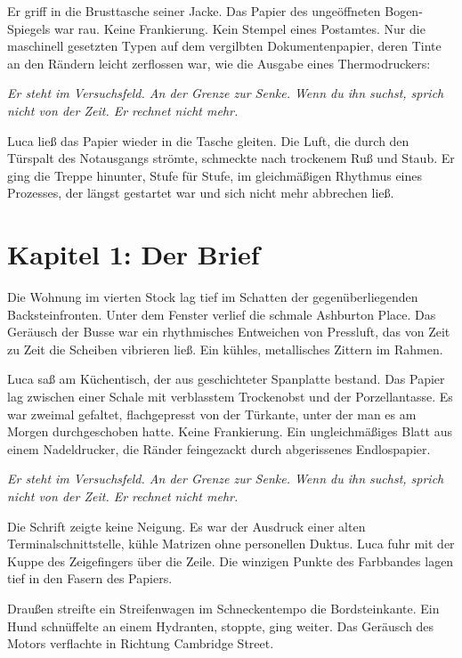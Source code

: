 \documentclass[
  ngerman,
]{article}
\begin{document}
Er griff in die Brusttasche seiner Jacke. Das Papier des ungeöffneten
Bogen-Spiegels war rau. Keine Frankierung. Kein Stempel eines Postamtes.
Nur die maschinell gesetzten Typen auf dem vergilbten Dokumentenpapier,
deren Tinte an den Rändern leicht zerflossen war, wie die Ausgabe eines
Thermodruckers:

\emph{Er steht im Versuchsfeld. An der Grenze zur Senke. Wenn du ihn
suchst, sprich nicht von der Zeit. Er rechnet nicht mehr.}

Luca ließ das Papier wieder in die Tasche gleiten. Die Luft, die durch
den Türspalt des Notausgangs strömte, schmeckte nach trockenem Ruß und
Staub. Er ging die Treppe hinunter, Stufe für Stufe, im gleichmäßigen
Rhythmus eines Prozesses, der längst gestartet war und sich nicht mehr
abbrechen ließ.

\section{\texorpdfstring{\textbf{Kapitel 1: Der
Brief}}{Kapitel 1: Der Brief}}\label{kapitel-1-der-brief}

Die Wohnung im vierten Stock lag tief im Schatten der gegenüberliegenden
Backsteinfronten. Unter dem Fenster verlief die schmale Ashburton Place.
Das Geräusch der Busse war ein rhythmisches Entweichen von Pressluft,
das von Zeit zu Zeit die Scheiben vibrieren ließ. Ein kühles,
metallisches Zittern im Rahmen.

Luca saß am Küchentisch, der aus geschichteter Spanplatte bestand. Das
Papier lag zwischen einer Schale mit verblasstem Trockenobst und der
Porzellantasse. Es war zweimal gefaltet, flachgepresst von der Türkante,
unter der man es am Morgen durchgeschoben hatte. Keine Frankierung. Ein
ungleichmäßiges Blatt aus einem Nadeldrucker, die Ränder feingezackt
durch abgerissenes Endlospapier.

\emph{Er steht im Versuchsfeld. An der Grenze zur Senke. Wenn du ihn
suchst, sprich nicht von der Zeit. Er rechnet nicht mehr.}

Die Schrift zeigte keine Neigung. Es war der Ausdruck einer alten
Terminalschnittstelle, kühle Matrizen ohne personellen Duktus. Luca fuhr
mit der Kuppe des Zeigefingers über die Zeile. Die winzigen Punkte des
Farbbandes lagen tief in den Fasern des Papiers.

Draußen streifte ein Streifenwagen im Schneckentempo die Bordsteinkante.
Ein Hund schnüffelte an einem Hydranten, stoppte, ging weiter. Das
Geräusch des Motors verflachte in Richtung Cambridge Street.
\end{document}
